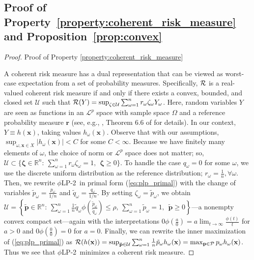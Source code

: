 \documentclass[opre,nonblindrev]{informs3} %
\newcommand{\x}{\mathbf{x}}
\newcommand{\p}{\mathbf{p}}
\newcommand{\plp}{$\phi$LP-2}
\begin{document}
%
 \begin{APPENDICES}

	\section{Proof of Property~\ref{property:coherent_risk_measure} and Proposition~\ref{prop:convex}}
	\label{sec:apx_proof} 


\begin{proof}{\sc Proof of Property \ref{property:coherent_risk_measure}}
	
A coherent risk measure has a dual representation that can be viewed as worst-case expectation from a set of probability measures. 
	Specifically, $\cal R$ is a real-valued coherent risk measure if and only if there exists a convex, bounded, and closed set $\mathcal{U}$ such that ${\cal R}(Y)=\sup_{\mathbf{\zeta} \in \mathcal{U}}\sum_{\omega=1}^n r_\omega \zeta_\omega Y_\omega$. 
	Here, random variables $Y$ are seen as functions in an $\mathcal{L}^p$ space with sample space $\Omega$ and a reference probability measure $\mathbf{r}$ (see, e.g., \cite{rockafellar2007coherent}, Theorem 6.6 of \cite{shaDR:09} for details). 
	In our context, $Y \equiv h(\x)$, taking values $h_\omega(\x)$. 
	Observe that with our assumptions, $\sup_{\omega, \x \in X} |h_\omega(\x)|<C$ for some $C<\infty$. 
		Because we have finitely many elements of $\omega$, the choice of norm or $\mathcal{L}^p$ space does not matter; so, $\mathcal{U} \subset \{\mathbf{\zeta} \in \mathbb{R}^n\colon\ \sum_{\omega=1}^{n} r_\omega \zeta_\omega = 1, \ \  \mathbf{\zeta} \geq 0 \}$.
	To handle the case $q_\omega=0$ for some $\omega$, we use the discrete uniform distribution as the reference distribution;  $r_\omega = \frac{1}{n}, \forall \omega$. 
	Then, we rewrite  \plp\ in primal form (\ref{eq:plp_primal}) with the change of variables $\tilde{p}_\omega = \frac{p_\omega}{1/n}$ and $\tilde{q}_\omega = \frac{q_\omega}{1/n}$. 
	By setting $\zeta_\omega = \tilde{p}_\omega$, we obtain $\mathcal{U}=\left\{ \tilde{\p}\in \mathbb{R}^n\colon \  \sum_{\omega=1}^{n} \frac{1}{n}\tilde{q}_\omega \phi\left( \frac{\tilde{p}_\omega}{\tilde{q}_\omega} \right) \leq \rho, \  \sum_{\omega=1}^{n}\tilde{p}_\omega =1, \ \ \tilde{\p} \geq 0 \right\}$---a nonempty convex compact set---again with the interpretations $0\phi\left(\frac{a}{0}\right)=a\lim_{t\rightarrow \infty}\frac{\phi(t)}{t}$ for $a>0$ and $0\phi\left(\frac{0}{0}\right)=0$ for $a=0$.
	Finally, we can rewrite the inner maximization of (\ref{eq:plp_primal}) as ${\cal R}(h(\x))=\sup_{\tilde{\p} \in \mathcal{U}}\sum_{\omega=1}^n \frac{1}{n} \tilde{p}_\omega h_\omega(\x) =\max_{\p \in {\mathcal{P}}} p_\omega h_\omega(\x)$. 
	Thus we see that \plp\ minimizes a coherent risk measure.
	\Halmos
\end{proof}


\end{APPENDICES}
\end{document}
